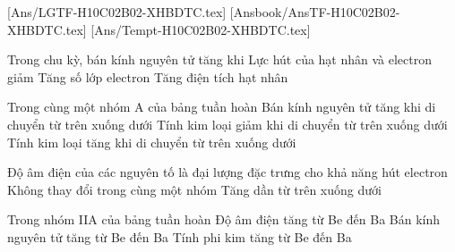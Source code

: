 
[Ans/LGTF-H10C02B02-XHBDTC.tex]
[Ansbook/AnsTF-H10C02B02-XHBDTC.tex]
[Ans/Tempt-H10C02B02-XHBDTC.tex]

\begin{ex}%
	Trong chu kỳ, bán kính nguyên tử tăng khi
	{\True Lực hút của hạt nhân và electron giảm}
	{\True Tăng số lớp electron}
	{Tăng điện tích hạt nhân}
\end{ex}

\begin{ex}%
	Trong cùng một nhóm A của bảng tuần hoàn
	{\True Bán kính nguyên tử tăng khi di chuyển từ trên xuống dưới}
	{Tính kim loại giảm khi di chuyển từ trên xuống dưới}
	{\True Tính kim loại tăng khi di chuyển từ trên xuống dưới}
\end{ex}
%
\begin{ex}%
	Độ âm điện của các nguyên tố 
	{\True là đại lượng đặc trưng cho khả năng hút electron}
	{Không thay đổi trong cùng một nhóm}
	{Tăng dần từ trên xuống dưới}
\end{ex}
%
\begin{ex}%
	Trong nhóm IIA của bảng tuần hoàn
	{Độ âm điện tăng từ Be đến Ba}
	{\True Bán kính nguyên tử tăng từ Be đến Ba}
	{Tính phi kim tăng từ Be đến Ba}
\end{ex}

